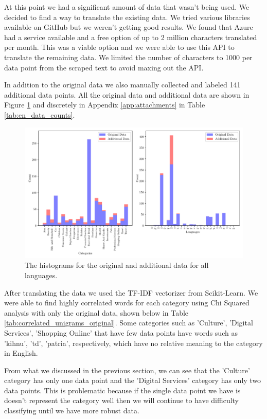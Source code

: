 At this point we had a significant amount of data that wasn't being used. We decided to find a way to translate the existing data. We tried various libraries available on GitHub but we weren't getting good results. We found that Azure had a service available and a free option of up to 2 million characters translated per month. This was a viable option and we were able to use this API to translate the remaining data. We limited the number of characters to 1000 per data point from the scraped text to avoid maxing out the API.

In addition to the original data we also manually collected and labeled 141 additional data points. All the original data and additional data are shown in Figure \ref{fig:all_hist} and discretely in Appendix \ref{app:attachments} in Table \ref{tab:en_data_counts}.


\begin{figure}[!ht]
  \centering
  \includegraphics[width=\textwidth]{../img/plot_all_hist.pdf}
  \caption{The histograms for the original and additional data for all languages.}
  \label{fig:all_hist}
\end{figure}


After translating the data we used the TF-IDF vectorizer from Scikit-Learn. We were able to find highly correlated words for each category using Chi Squared analysis with only the original data, shown below in Table \ref{tab:correlated_unigrams_original}. Some categories such as 'Culture', 'Digital Services', 'Shopping Online' that have few data points have words such as 'kihnu', 'td', 'patria', respectively, which have no relative meaning to the category in English. 

From what we discussed in the previous section, we can see that the 'Culture' category has only one data point and the 'Digital Services' category has only two data points. This is problematic because if the single data point we have is doesn't represent the category well then we will continue to have difficulty classifying until we have more robust data.


